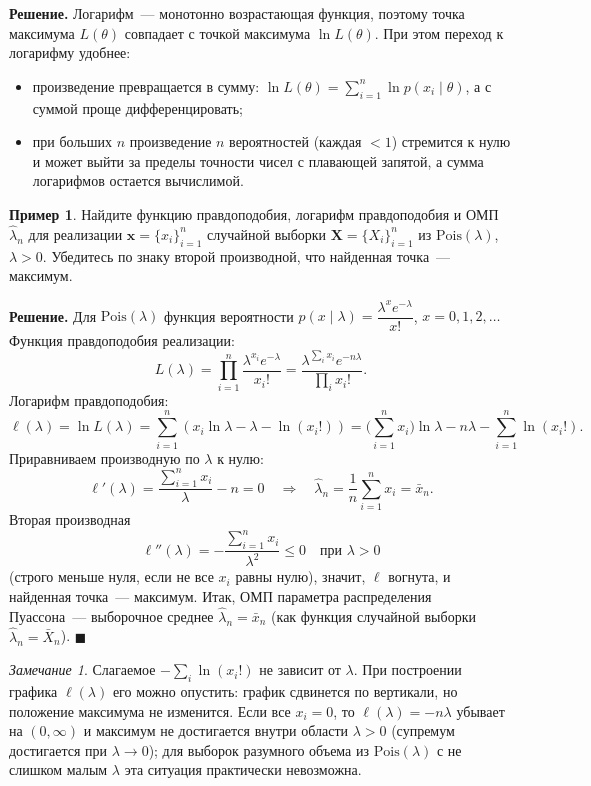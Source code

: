 \documentclass[a4paper,12pt]{article}
\theoremstyle{definition}
\newtheorem{example}{Пример}
\theoremstyle{plain}
\theoremstyle{remark}
\newtheorem*{remark}{Замечание}
\begin{document}
\noindent\textbf{Решение.} Логарифм~--- монотонно возрастающая функция, поэтому точка максимума $L(\theta)$ совпадает с точкой максимума $\ln L(\theta)$. При этом переход к логарифму удобнее:
\begin{itemize}
  \item произведение превращается в сумму: $\ln L(\theta)=\sum_{i=1}^n\ln p(x_i\mid\theta)$, а с суммой проще дифференцировать;
  \item при больших $n$ произведение $n$ вероятностей (каждая $<1$) стремится к нулю и может выйти за пределы точности чисел с плавающей запятой, а сумма логарифмов остается вычислимой.
\end{itemize}

\begin{example}\label{ex:poisson-mle}
Найдите функцию правдоподобия, логарифм правдоподобия и ОМП $\hat\lambda_n$ для реализации $\mathbf{x}=\{x_i\}_{i=1}^n$ случайной выборки $\mathbf{X}=\{X_i\}_{i=1}^n$ из $\mathrm{Pois}(\lambda)$, $\lambda>0$. Убедитесь по знаку второй производной, что найденная точка~--- максимум.
\end{example}

\noindent\textbf{Решение.} Для $\mathrm{Pois}(\lambda)$ функция вероятности $p(x\mid\lambda)=\dfrac{\lambda^x e^{-\lambda}}{x!}$, $x=0,1,2,\dots$ Функция правдоподобия реализации:
$$L(\lambda)=\prod_{i=1}^n\frac{\lambda^{x_i}e^{-\lambda}}{x_i!}=\frac{\lambda^{\sum_i x_i}e^{-n\lambda}}{\prod_i x_i!}.$$
Логарифм правдоподобия:
$$\ell(\lambda)=\ln L(\lambda)=\sum_{i=1}^n\left(x_i\ln\lambda-\lambda-\ln(x_i!)\right)=\Big(\sum_{i=1}^n x_i\Big)\ln\lambda-n\lambda-\sum_{i=1}^n\ln(x_i!).$$
Приравниваем производную по $\lambda$ к нулю:
$$\ell'(\lambda)=\frac{\sum_{i=1}^n x_i}{\lambda}-n=0\quad\Longrightarrow\quad \hat\lambda_n=\frac1n\sum_{i=1}^n x_i=\bar x_n.$$
Вторая производная
$$\ell''(\lambda)=-\frac{\sum_{i=1}^n x_i}{\lambda^2}\le0\quad\text{при }\lambda>0$$
(строго меньше нуля, если не все $x_i$ равны нулю), значит, $\ell$ вогнута, и найденная точка~--- максимум. Итак, ОМП параметра распределения Пуассона~--- выборочное среднее $\hat\lambda_n=\bar x_n$ (как функция случайной выборки $\hat\lambda_n=\bar X_n$). \hfill$\blacksquare$

\begin{remark}
Слагаемое $-\sum_i\ln(x_i!)$ не зависит от $\lambda$. При построении графика $\ell(\lambda)$ его можно опустить: график сдвинется по вертикали, но положение максимума не изменится. Если все $x_i=0$, то $\ell(\lambda)=-n\lambda$ убывает на $(0,\infty)$ и максимум не достигается внутри области $\lambda>0$ (супремум достигается при $\lambda\to0$); для выборок разумного объема из $\mathrm{Pois}(\lambda)$ с не слишком малым $\lambda$ эта ситуация практически невозможна.
\end{remark}
\end{document}
